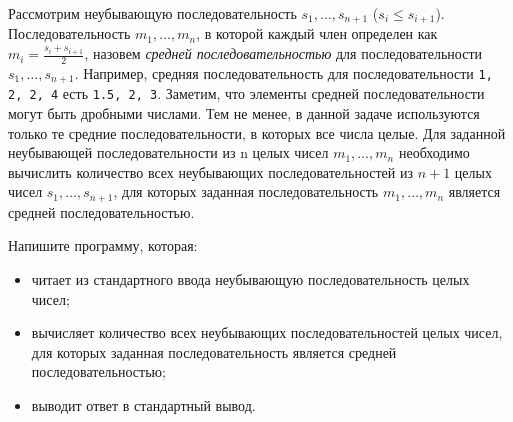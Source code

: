 Рассмотрим неубывающую последовательность $s_1, \ldots, s_{n+1}$ ($s_i \le s_{i + 1}$).
Последовательность $m_1, \ldots, m_n$, в которой каждый член определен как 
$m_i = \frac{s_i + s_{i + 1}}{2}$, назовем {\it средней последовательностью} для последовательности 
$s_1, \ldots, s_{n + 1}$. Например, средняя последовательность для последовательности 
\texttt{1, 2, 2, 4} есть \texttt{1.5, 2, 3}. Заметим, что элементы средней последовательности могут быть дробными числами. 
Тем не менее, в данной задаче используются только те средние последовательности, в которых все числа целые.
Для заданной неубывающей последовательности из n целых чисел $m_1, \ldots, m_n$
необходимо вычислить количество всех неубывающих последовательностей из $n + 1$ целых чисел
$s_1, \ldots, s_{n + 1}$, для которых заданная последовательность $m_1, \ldots, m_n$ является средней последовательностью.

Напишите программу, которая:

\begin{itemize}
\item читает из стандартного ввода неубывающую последовательность целых чисел;
\item вычисляет количество всех неубывающих последовательностей целых чисел, для которых заданная последовательность является средней последовательностью;
\item выводит ответ в стандартный вывод.
\end{itemize}

